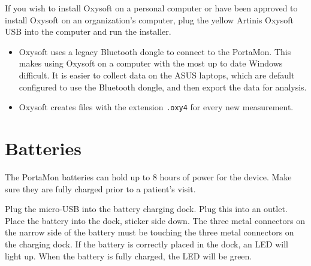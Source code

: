 \documentclass[
]{book}
\begin{document}
If you wish to install Oxysoft on a personal computer or have been approved to install Oxysoft on an organization's computer, plug the yellow Artinis Oxysoft USB into the computer and run the installer.

\begin{itemize}
\item
  Oxysoft uses a legacy Bluetooth dongle to connect to the PortaMon. This makes using Oxysoft on a computer with the most up to date Windows difficult. It is easier to collect data on the ASUS laptops, which are default configured to use the Bluetooth dongle, and then export the data for analysis.
\item
  Oxysoft creates files with the extension \texttt{.oxy4} for every new measurement.
\end{itemize}

\hypertarget{PortaMon-Batteries}{%
\section{Batteries}\label{PortaMon-Batteries}}

The PortaMon batteries can hold up to 8 hours of power for the device. Make sure they are fully charged prior to a patient's visit.

Plug the micro-USB into the battery charging dock. Plug this into an outlet. Place the battery into the dock, sticker side down. The three metal connectors on the narrow side of the battery must be touching the three metal connectors on the charging dock. If the battery is correctly placed in the dock, an LED will light up. When the battery is fully charged, the LED will be green.
\end{document}
